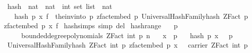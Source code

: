 \begin{isabellebody}
\endisatagproof
{\isafoldproof}%
%
\isadelimproof
\isanewline
%
\endisadelimproof
\isanewline
{}\isamarkupfalse%
\ hash\ {\isacharcolon}{\kern0pt}{\isacharcolon}{\kern0pt}\ {\isachardoublequoteopen}nat\ {\isasymRightarrow}\ nat\ {\isasymRightarrow}\ int\ set\ list\ {\isasymRightarrow}\ nat{\isachardoublequoteclose}\isanewline
\ \ \ {\isachardoublequoteopen}hash\ p\ x\ f\ {\isacharequal}{\kern0pt}\ the{\isacharunderscore}{\kern0pt}inv{\isacharunderscore}{\kern0pt}into\ {\isacharbraceleft}{\kern0pt}{}{\isachardot}{\kern0pt}{\isachardot}{\kern0pt}{\isacharless}{\kern0pt}p{\isacharbraceright}{\kern0pt}\ {\isacharparenleft}{\kern0pt}zfact{\isacharunderscore}{\kern0pt}embed\ p{\isacharparenright}{\kern0pt}\ {\isacharparenleft}{\kern0pt}UniversalHashFamily{\isachardot}{\kern0pt}hash\ {\isacharparenleft}{\kern0pt}ZFact\ p{\isacharparenright}{\kern0pt}\ {\isacharparenleft}{\kern0pt}zfact{\isacharunderscore}{\kern0pt}embed\ p\ x{\isacharparenright}{\kern0pt}\ f{\isacharparenright}{\kern0pt}{\isachardoublequoteclose}\isanewline
\isanewline
{}\isamarkupfalse%
\ hash{\isachardot}{\kern0pt}simps\ {\isacharbrackleft}{\kern0pt}simp\ del{\isacharbrackright}{\kern0pt}\isanewline
\isanewline
{}\isamarkupfalse%
\ hash{\isacharunderscore}{\kern0pt}range{\isacharcolon}{\kern0pt}\isanewline
\ \ \ {\isachardoublequoteopen}p\ {\isachargreater}{\kern0pt}\ {}{\isachardoublequoteclose}\isanewline
\ \ \ {\isachardoublequoteopen}{\isasymomega}\ {\isasymin}\ bounded{\isacharunderscore}{\kern0pt}degree{\isacharunderscore}{\kern0pt}polynomials\ {\isacharparenleft}{\kern0pt}ZFact\ {\isacharparenleft}{\kern0pt}int\ p{\isacharparenright}{\kern0pt}{\isacharparenright}{\kern0pt}\ n{\isachardoublequoteclose}\isanewline
\ \ \ {\isachardoublequoteopen}x\ {\isacharless}{\kern0pt}\ p{\isachardoublequoteclose}\isanewline
\ \ \ {\isachardoublequoteopen}hash\ p\ x\ {\isasymomega}\ {\isacharless}{\kern0pt}\ p{\isachardoublequoteclose}\isanewline
%
\isadelimproof
%
\endisadelimproof
%
\isatagproof
{}\isamarkupfalse%
\ {\isacharminus}{\kern0pt}\isanewline
\ \ \isamarkupfalse%
\ {\isachardoublequoteopen}UniversalHashFamily{\isachardot}{\kern0pt}hash\ {\isacharparenleft}{\kern0pt}ZFact\ {\isacharparenleft}{\kern0pt}int\ p{\isacharparenright}{\kern0pt}{\isacharparenright}{\kern0pt}\ {\isacharparenleft}{\kern0pt}zfact{\isacharunderscore}{\kern0pt}embed\ p\ x{\isacharparenright}{\kern0pt}\ {\isasymomega}\ {\isasymin}\ carrier\ {\isacharparenleft}{\kern0pt}ZFact\ {\isacharparenleft}{\kern0pt}int\ p{\isacharparenright}{\kern0pt}{\isacharparenright}{\kern0pt}{\isachardoublequoteclose}\isanewline

\end{isabellebody}

